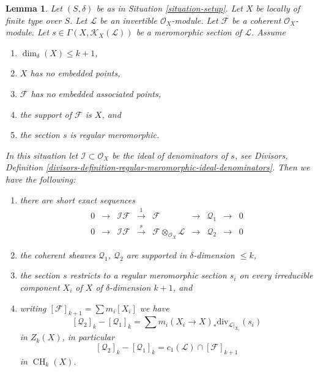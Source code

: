 \documentclass[10pt,a4paper]{amsart}
\theoremstyle{plain}
\newtheorem{lemma}[subsection]{Lemma}
\theoremstyle{definition}
\theoremstyle{remark}
\numberwithin{equation}{subsection}
\def\CH{\mathop{\mathrm{CH}}\nolimits}
\begin{document}
\begin{lemma}
\label{lemma-no-embedded-points}
Let $(S, \delta)$ be as in Situation \ref{situation-setup}.
Let $X$ be locally of finite type over $S$.
Let $\mathcal{L}$ be an invertible $\mathcal{O}_X$-module.
Let $\mathcal{F}$ be a coherent $\mathcal{O}_X$-module.
Let $s \in \Gamma(X, \mathcal{K}_X(\mathcal{L}))$ be a
meromorphic section of $\mathcal{L}$.
Assume
\begin{enumerate}
\item $\dim_\delta(X) \leq k + 1$,
\item $X$ has no embedded points,
\item $\mathcal{F}$ has no embedded associated points,
\item the support of $\mathcal{F}$ is $X$, and
\item the section $s$ is regular meromorphic.
\end{enumerate}
In this situation let $\mathcal{I} \subset \mathcal{O}_X$
be the ideal of denominators of $s$, see
Divisors,
Definition \ref{divisors-definition-regular-meromorphic-ideal-denominators}.
Then we have the following:
\begin{enumerate}
\item there are short exact sequences
$$
\begin{matrix}
0 &
\to &
\mathcal{I}\mathcal{F} &
\xrightarrow{1} &
\mathcal{F} &
\to &
\mathcal{Q}_1 &
\to &
0 \\
0 &
\to &
\mathcal{I}\mathcal{F} &
\xrightarrow{s} &
\mathcal{F} \otimes_{\mathcal{O}_X} \mathcal{L} &
\to &
\mathcal{Q}_2 &
\to &
0
\end{matrix}
$$
\item the coherent sheaves $\mathcal{Q}_1$, $\mathcal{Q}_2$
are supported in $\delta$-dimension $\leq k$,
\item the section $s$ restricts to a regular meromorphic
section $s_i$ on every irreducible component $X_i$ of
$X$ of $\delta$-dimension $k + 1$, and
\item writing $[\mathcal{F}]_{k + 1} = \sum m_i[X_i]$ we have
$$
[\mathcal{Q}_2]_k - [\mathcal{Q}_1]_k
=
\sum m_i(X_i \to X)_*\text{div}_{\mathcal{L}|_{X_i}}(s_i)
$$
in $Z_k(X)$, in particular
$$
[\mathcal{Q}_2]_k - [\mathcal{Q}_1]_k
=
c_1(\mathcal{L}) \cap [\mathcal{F}]_{k + 1}
$$
in $\CH_k(X)$.
\end{enumerate}
\end{lemma}
\end{document}
